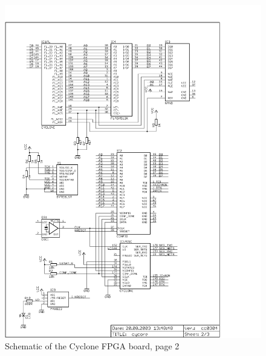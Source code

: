 \begin{figure}
    \centering
    \includegraphics[scale=0.68]{appendix/cycore_p2}
    \caption{Schematic of the Cyclone FPGA board, page 2}
\end{figure}
